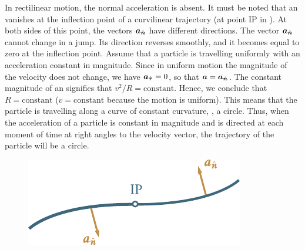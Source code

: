 In rectilinear motion, the normal acceleration is absent. It must be noted that an vanishes at the inflection point of a curvilinear trajectory (at point IP in ). At both sides of this point, the vectors $\boldsymbol{a}_{\hat{\boldsymbol{n}}}$ have different directions. The vector $\boldsymbol{a}_{\hat{\boldsymbol{n}}}$ cannot change in a jump. Its direction reverses smoothly, and it becomes equal to zero at the inflection point. Assume that a particle is travelling uniformly with an acceleration constant in magnitude. Since in uniform motion the magnitude of the velocity does not change, we have $\boldsymbol{a}_{\hat{\boldsymbol{\tau}}}=0$, so that $\boldsymbol{a}=\boldsymbol{a}_{\hat{\boldsymbol{n}}}$. The constant magnitude of an signifies that $v^2/R=\text{constant}$. Hence, we conclude that $R=\text{constant}$ ($v=\text{constant}$ because the motion is uniform). This means that the particle is travelling along a curve of constant curvature, \ie, a circle. Thus, when the acceleration of a particle is constant in magnitude and is directed at each moment of time at right angles to the velocity vector, the trajectory of the particle will be a circle.

\begin{figure}[t]
	\begin{center}
		\includegraphics[scale=0.95]{figures/ch_01/fig_1_28.pdf}
		\caption[]{}
		\label{fig:1_28}
	\end{center}
	\vspace{-0.6cm}
\end{figure}


